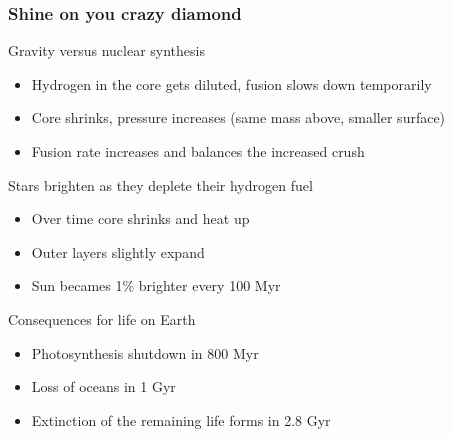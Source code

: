 \documentclass[aspectratio=169]{beamer}
\begin{document}
\begin{frame}
\frametitle{Shine on you crazy diamond}
\begin{block}{Gravity versus nuclear synthesis}
\begin{itemize}
\item Hydrogen in the core gets diluted, fusion slows down temporarily
\item Core shrinks, pressure increases (same mass above, smaller surface)
\item Fusion rate increases and balances the increased crush
\end{itemize}
\end{block}
\begin{block}{Stars brighten as they deplete their hydrogen fuel}
\begin{itemize}
\item Over time core shrinks and heat up
\item Outer layers slightly expand
\item Sun becames 1\% brighter every 100 Myr
\end{itemize}
\end{block}

\begin{block}{Consequences for life on Earth}
\begin{itemize}
\item{Photosynthesis shutdown in 800 Myr}
\item{Loss of oceans in 1 Gyr}
\item{Extinction of the remaining life forms in 2.8 Gyr}
\end{itemize}
\end{block}
\end{frame}
\end{document}
